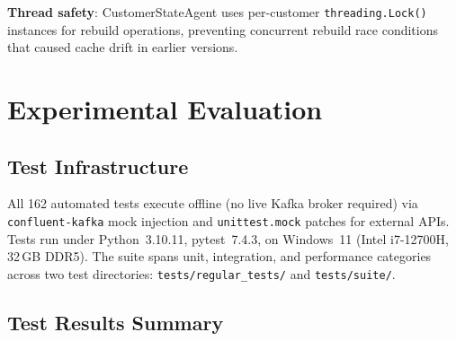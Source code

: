 \documentclass[runningheads]{llncs}
\begin{document}
\textbf{Thread safety}: CustomerStateAgent uses per-customer \texttt{threading.Lock()} instances for rebuild operations, preventing concurrent rebuild race conditions that caused cache drift in earlier versions.

\section{Experimental Evaluation}
\label{sec:eval}

\subsection{Test Infrastructure}

All 162 automated tests execute offline (no live Kafka broker required) via \texttt{confluent-kafka} mock injection and \texttt{unittest.mock} patches for external APIs. Tests run under Python~3.10.11, pytest~7.4.3, on Windows~11 (Intel i7-12700H, 32\,GB DDR5). The suite spans unit, integration, and performance categories across two test directories: \texttt{tests/regular\_tests/} and \texttt{tests/suite/}.

\subsection{Test Results Summary}
\end{document}
